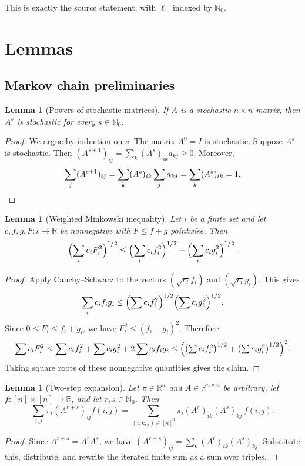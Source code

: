 \documentclass[11pt]{article}
\newtheorem{lemma}[theorem]{Lemma}
\theoremstyle{definition}
\theoremstyle{remark}
\newcommand{\R}{\mathbb{R}}
\newcommand{\Nz}{\mathbb{N}_0}
\begin{document}
This is exactly the source statement, with $\ell_1$ indexed by $\Nz$.

\section{Lemmas}

\subsection{Markov chain preliminaries}

\begin{lemma}[Powers of stochastic matrices]\label{lem:stoch_pow}
If $A$ is a stochastic $n\times n$ matrix, then $A^s$ is stochastic for every $s\in\Nz$.
\end{lemma}
\begin{proof}
We argue by induction on $s$. The matrix $A^0=I$ is stochastic. Suppose $A^s$ is stochastic. Then $(A^{s+1})_{ij}=\sum_k(A^s)_{ik}a_{kj}\ge0$. Moreover,
\[
\sum_j(A^{s+1})_{ij}=\sum_k(A^s)_{ik}\sum_ja_{kj}=\sum_k(A^s)_{ik}=1. \qedhere
\]
\end{proof}

\begin{lemma}[Weighted Minkowski inequality]\label{lem:weighted_minkowski}
Let $\iota$ be a finite set and let $c,f,g,F:\iota\to\R$ be nonnegative with $F\le f+g$ pointwise. Then
\[
\Bigl(\sum_ic_iF_i^2\Bigr)^{1/2}\le\Bigl(\sum_ic_if_i^2\Bigr)^{1/2}+\Bigl(\sum_ic_ig_i^2\Bigr)^{1/2}.
\]
\end{lemma}
\begin{proof}
Apply Cauchy--Schwarz to the vectors $(\sqrt{c_i}f_i)$ and $(\sqrt{c_i}g_i)$. This gives
\[
\sum_ic_if_ig_i\le\Bigl(\sum c_if_i^2\Bigr)^{1/2}\Bigl(\sum c_ig_i^2\Bigr)^{1/2}.
\]
Since $0\le F_i\le f_i+g_i$, we have $F_i^2\le(f_i+g_i)^2$. Therefore
\[
\sum c_iF_i^2\le\sum c_if_i^2+\sum c_ig_i^2+2\sum c_if_ig_i\le\Bigl(\bigl(\textstyle\sum c_if_i^2\bigr)^{1/2}+\bigl(\textstyle\sum c_ig_i^2\bigr)^{1/2}\Bigr)^2 .
\]
Taking square roots of these nonnegative quantities gives the claim.
\end{proof}

\begin{lemma}[Two-step expansion]\label{lem:markov_subadd_expand}
Let $\pi\in\R^n$ and $A\in\R^{n\times n}$ be arbitrary, let $f:[n]\times[n]\to\R$, and let $r,s\in\Nz$. Then
\[
\sum_{i,j}\pi_i(A^{r+s})_{ij}f(i,j)=\sum_{(i,k,j)\in[n]^3}\pi_i(A^r)_{ik}(A^s)_{kj}\,f(i,j).
\]
\end{lemma}
\begin{proof}
Since $A^{r+s}=A^rA^s$, we have $(A^{r+s})_{ij}=\sum_k(A^r)_{ik}(A^s)_{kj}$. Substitute this, distribute, and rewrite the iterated finite sum as a sum over triples.
\end{proof}
\end{document}

